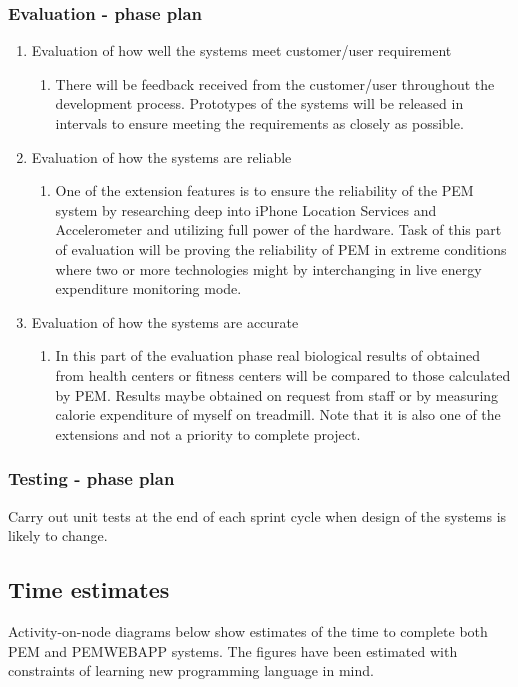 \documentclass[12pt, a4paper]{report}   %
\begin{document}
\begin{enumerate}
\subsubsection{Evaluation - phase plan}
\begin{enumerate}
	\item Evaluation of how well the systems meet customer/user requirement
		\begin{enumerate}
			\item There will be feedback received from the customer/user throughout the development process. Prototypes of the systems will be released in intervals to ensure meeting the requirements as closely as possible.
		\end{enumerate}
	\item Evaluation of how the systems are reliable
		\begin{enumerate}
			\item One of the extension features is to ensure the reliability of the PEM system by researching deep into iPhone Location Services and Accelerometer and utilizing full power of the hardware. Task of this part of evaluation will be proving the reliability of PEM in extreme conditions where two or more technologies might by interchanging in live energy expenditure monitoring mode.
		\end{enumerate}
	\item Evaluation of how the systems are accurate
		\begin{enumerate}
			\item In this part of the evaluation phase real biological results of obtained from health centers or fitness centers will be compared to those calculated by PEM. Results maybe obtained on request from staff or by measuring calorie expenditure of myself on treadmill. Note that it is also one of the extensions and not a priority to complete project.
		\end{enumerate}
\end{enumerate}


\subsubsection{Testing - phase plan}
Carry out unit tests at the end of each sprint cycle when design of the systems is likely to change.


\subsection{Time estimates}
Activity-on-node diagrams below show estimates of the time to complete both PEM and PEMWEBAPP systems. The figures have been estimated with constraints of learning new programming language in mind.


\end{enumerate}
\end{document}
